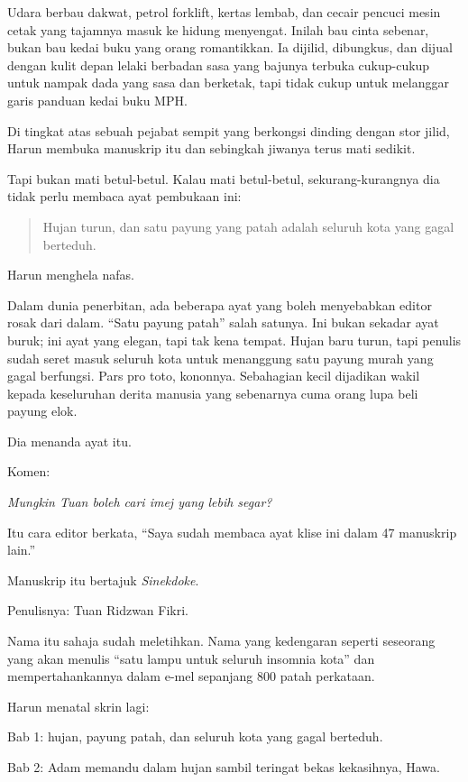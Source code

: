 \documentclass[
  11pt,
  a5paper,
  openany,
  oneside]{book}
\begin{document}
Udara berbau dakwat, petrol forklift, kertas lembab, dan cecair pencuci
mesin cetak yang tajamnya masuk ke hidung menyengat. Inilah bau cinta
sebenar, bukan bau kedai buku yang orang romantikkan. Ia dijilid,
dibungkus, dan dijual dengan kulit depan lelaki berbadan sasa yang
bajunya terbuka cukup-cukup untuk nampak dada yang sasa dan berketak,
tapi tidak cukup untuk melanggar garis panduan kedai buku MPH.

Di tingkat atas sebuah pejabat sempit yang berkongsi dinding dengan stor
jilid, Harun membuka manuskrip itu dan sebingkah jiwanya terus mati
sedikit.

Tapi bukan mati betul-betul. Kalau mati betul-betul, sekurang-kurangnya
dia tidak perlu membaca ayat pembukaan ini:

\begin{quote}
Hujan turun, dan satu payung yang patah adalah seluruh kota yang gagal
berteduh.
\end{quote}

Harun menghela nafas.

Dalam dunia penerbitan, ada beberapa ayat yang boleh menyebabkan editor
rosak dari dalam. ``Satu payung patah'' salah satunya. Ini bukan sekadar
ayat buruk; ini ayat yang elegan, tapi tak kena tempat. Hujan baru
turun, tapi penulis sudah seret masuk seluruh kota untuk menanggung satu
payung murah yang gagal berfungsi. Pars pro toto, kononnya. Sebahagian
kecil dijadikan wakil kepada keseluruhan derita manusia yang sebenarnya
cuma orang lupa beli payung elok.

Dia menanda ayat itu.

Komen:

\emph{Mungkin Tuan boleh cari imej yang lebih segar?}

Itu cara editor berkata, ``Saya sudah membaca ayat klise ini dalam 47
manuskrip lain.''

Manuskrip itu bertajuk \emph{Sinekdoke}.

Penulisnya: Tuan Ridzwan Fikri.

Nama itu sahaja sudah meletihkan. Nama yang kedengaran seperti seseorang
yang akan menulis ``satu lampu untuk seluruh insomnia kota'' dan
mempertahankannya dalam e-mel sepanjang 800 patah perkataan.

Harun menatal skrin lagi:

Bab 1: hujan, payung patah, dan seluruh kota yang gagal berteduh.

Bab 2: Adam memandu dalam hujan sambil teringat bekas kekasihnya, Hawa.
\end{document}
